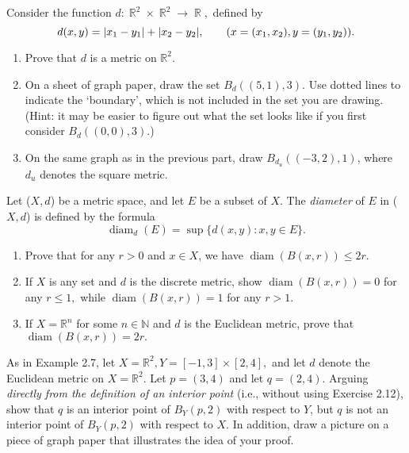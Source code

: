 \documentclass[12pt,letterpaper,boxed]{hmcpset}
\DeclarePairedDelimiter\abs{\lvert}{\rvert}
\DeclareMathOperator{\diam}{diam}
\DeclareMathOperator{\R}{\mathbb{R}}
\begin{document}
\begin{problem}[Exercise 2.6.]
Consider the function $d: \R^{2} \times \R^{2} \rightarrow \R,$ defined by $$d(x, y) = \abs{x_1 - y_1} + \abs{x_2 - y_2}, \quad \quad (x = (x_1, x_2), y = (y_1, y_2)). $$
\vspace{-2mm}
\begin{enumerate}
	\itemsep0em
	\item Prove that $d$ is a metric on $\mathbb{R}^{2}.$
	\item On a sheet of graph paper, draw the set $B_{d}((5, 1), 3).$ Use dotted lines to indicate the ‘boundary’,
which is not included in the set you are drawing. (Hint: it may be easier to figure out what the
set looks like if you first consider $B_{d}((0, 0), 3).$)
	\item On the same graph as in the previous part, draw $B_{d_{u}}((-3, 2),1)$, where $d_{u}$ denotes the square metric.
\end{enumerate}
\end{problem}
\begin{solution}

\end{solution}

\begin{problem}[Exercise 2.8.]
Let ($X, d$) be a metric space, and let $E$ be a subset of $X$. The \textit{diameter} of $E$ in ($X,d$) is defined by the formula $$\diam_{d}(E) = \sup\{d(x,y) : x,y \in E\}.$$

\vspace{-2mm}
\begin{enumerate}
	\itemsep0em
	\item Prove that for any $r > 0$ and $x \in X$, we have $\diam(B(x,r))\leq 2r.$
	\item If $X$ is any set and $d$ is the discrete metric, show $\diam(B(x, r)) = 0$ for any $r \leq 1,$ while $\diam(B(x,r)) = 1$ for any $r > 1$.
	\item If $X = \mathbb{R}^{n}$ for some $n \in \mathbb{N}$ and $d$ is the Euclidean metric, prove that $\diam(B(x,r)) = 2r.$ 
\end{enumerate}

\end{problem}
\begin{solution}

\end{solution}

\begin{problem}[Exercise 2.11.]
As in Example 2.7, let $X = \mathbb{R}^{2}, Y = [-1,3]\times[2,4],$ and let $d$ denote the Euclidean metric on $X = \mathbb{R}^{2}.$ Let $p = (3,4)$ and let $q = (2, 4)$. Arguing \textit{directly from the definition of an interior point} (i.e., without using Exercise 2.12), show that $q$ is an interior point of $B_{Y}(p,2)$ with respect to $Y$, but $q$ is not an interior point of $B_{Y}(p,2)$ with respect to $X$. In addition, draw a picture on a piece of graph paper that illustrates the idea of your proof.
\end{problem}
\begin{solution}

\end{solution}
\end{document}
